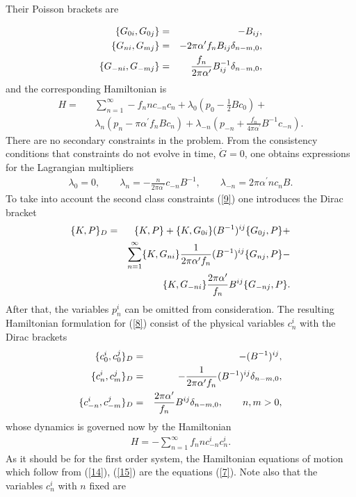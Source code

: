 \documentclass[a4paper]{article}
\begin{document}
\noindent Their Poisson brackets are

\begin{eqnarray}\label{10}
\{G_{0i}, G_{0j}\}&=&-B_{ij}, \cr
\{G_{ni}, G_{mj}\}&=&-2\pi\alpha^\prime f_nB_{ij}\delta_{n-m,0}, \cr
\{G_{-ni}, G_{-mj}\}&=&\frac{f_n}{2\pi\alpha^\prime}B^{-1}_{ij}
\delta_{n-m,0},
\end{eqnarray}
and the corresponding Hamiltonian is
\begin{eqnarray}\label{11}
H=&&\sum_{n=1}^\infty -f_nnc_{-n}c_n +
\lambda_0(p_0-\frac 12Bc_0)+ \nonumber \\
&&\lambda_n(p_n-\pi\alpha^\prime f_nBc_n)+ 
\lambda_{-n}(p_{-n}+\frac{f_n}{4\pi\alpha^\prime}B^{-1}c_{-n}).
\end{eqnarray}
There are no secondary constraints in the problem. From the 
consistency conditions that constraints do not evolve in time, $\dot G=0$,
one obtains expressions for the Lagrangian multipliers 
\begin{eqnarray}\label{12}
\lambda_0=0, \qquad \lambda_n=-\frac{n}{2\pi\alpha^\prime}c_{-n}B^{-1}, 
\qquad \lambda_{-n}=2\pi\alpha^\prime nc_nB.
\end{eqnarray}
To take into account the second class constraints (\ref{9}) one 
introduces the Dirac bracket 
\begin{eqnarray}\label{13}
\{K, P\}_D=&&\{K, P\}
+\{K, G_{0i}\}(B^{-1})^{ij}\{G_{0j}, P\}+ \nonumber \cr
&&\sum_{n=1}^\infty
\{K, G_{ni}\}\frac{1}{2\pi\alpha^\prime f_n}
(B^{-1})^{ij}\{G_{nj}, P\}-\nonumber \\
&&\{K, G_{-ni}\}\frac{2\pi\alpha^\prime}{f_n}B^{ij}
\{G_{-nj}, P\}.
\end{eqnarray}
After that, the variables $p_n^i$ can be omitted from consideration. 
The resulting Hamiltonian formulation for (\ref{8}) consist of the 
physical variables $c_n^i$ with the Dirac brackets 
\begin{eqnarray}\label{14}
\{c_0^i, c_0^j\}_D&=&-(B^{-1})^{ij}, \cr
\{c_n^i, c_m^j\}_D&=&-\frac{1}{2\pi\alpha^\prime f_n}
(B^{-1})^{ij}\delta_{n-m,0}, \cr
\{c_{-n}^i, c_{-m}^j\}_D&=&\frac{2\pi\alpha^\prime}{f_n}
B^{ij}\delta_{n-m,0}, \qquad n, m>0,
\end{eqnarray}
whose dynamics is governed now by the Hamiltonian 
\begin{eqnarray}\label{15}
H=-\sum_{n=1}^\infty f_nnc^i_{-n}c^i_n.
\end{eqnarray}
As it should be for the first order system, the Hamiltonian equations 
of motion which follow from (\ref{14}), (\ref{15}) are the equations 
(\ref{7}). Note also that the variables $c_n^i$ with $n$ fixed are 
\end{document}
